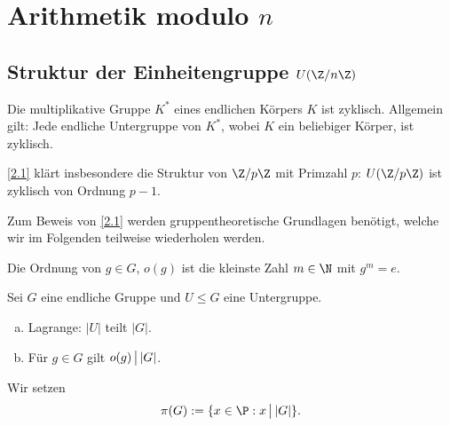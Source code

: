 \chapter{Arithmetik modulo $n$}


\section{Struktur der Einheitengruppe $U(\Z/ n\Z)$}


\begin{st} \label{2.1}
	Die multiplikative Gruppe $K^*$ eines endlichen Körpers $K$ ist zyklisch.
	Allgemein gilt: Jede endliche Untergruppe von $K^*$, wobei $K$ ein beliebiger Körper, ist zyklisch.
	\begin{note}
		\ref{2.1} klärt insbesondere die Struktur von $\Z / p\Z$ mit Primzahl $p$: $U(\Z / p\Z)$ ist zyklisch von Ordnung $p - 1$.

		Zum Beweis von \ref{2.1} werden gruppentheoretische Grundlagen benötigt, welche wir im Folgenden teilweise wiederholen werden.
	\end{note}
\end{st}

\begin{df*}
	Die Ordnung von $g \in G$, $o(g)$ ist die kleinste Zahl $m \in \N$ mit $g^m = e$.
\end{df*}

\begin{st} \label{2.2}
	Sei $G$ eine endliche Gruppe und $U \le G$ eine Untergruppe.
	\begin{enumerate}[a)]
		\item
			Lagrange: $|U|$ teilt $|G|$.
		\item
			Für $g \in G$ gilt $o(g) \divs |G|$.
	\end{enumerate}
\end{st}

\begin{df*}
	Wir setzen
	\[
		\pi(G) := \{ x \in \P : x \divs |G| \}.
	\]
\end{df*}

